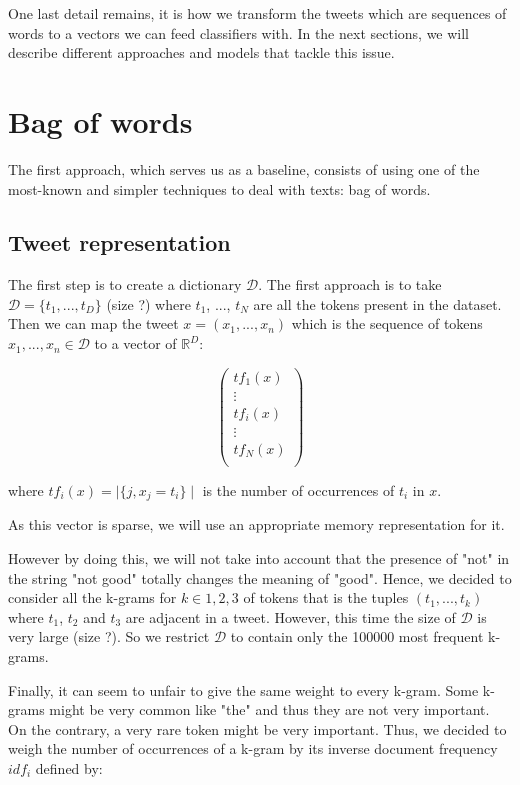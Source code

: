 \documentclass[10pt,conference,compsocconf]{IEEEtran}
\begin{document}
One last detail remains, it is how we transform the tweets which are sequences of words to a vectors we can feed classifiers with. In the next sections, we will describe different approaches and models that tackle this issue.

\section{Bag of words}

The first approach, which serves us as a baseline, consists of using one of the most-known and simpler techniques to deal with texts: bag of words.

\subsection{Tweet representation}

The first step is to create a dictionary $\mathcal{D}$. The first approach is to take $\mathcal{D} = \{ t_1, ..., t_D \}$ (size ?) where $t_1$, ..., $t_N$ are all the tokens present in the dataset. Then we can map the tweet $x = (x_1, ..., x_n)$ which is the sequence of tokens $x_1, ..., x_n \in \mathcal{D}$ to a vector of $\mathbb{R}^D$:

$$
\left(
\begin{array}{c}
tf_1(x) \\
\vdots \\
tf_i(x) \\
\vdots \\
tf_N(x) \\
\end{array}
\right)
$$

where $tf_i(x) = \mid \{j, x_j = t_i \} \mid$ is the number of occurrences of $t_i$ in $x$.

As this vector is sparse, we will use an appropriate memory representation for it.

However by doing this, we will not take into account that the presence of "not" in the string "not good" totally changes the meaning of "good". Hence, we decided to consider all the k-grams for $k \in {1, 2, 3}$ of tokens that is the tuples $(t_1, ..., t_k)$ where $t_1$, $t_2$ and $t_3$ are adjacent in a tweet. However, this time the size of $\mathcal{D}$ is very large (size ?). So we restrict $\mathcal{D}$ to contain only the 100000 most frequent k-grams.

Finally, it can seem to unfair to give the same weight to every k-gram. Some k-grams might be very common like "the" and thus they are not very important. On the contrary, a very rare token might be very important. Thus, we decided to weigh the number of occurrences of a k-gram by its inverse document frequency $idf_i$ defined by:
\end{document}
